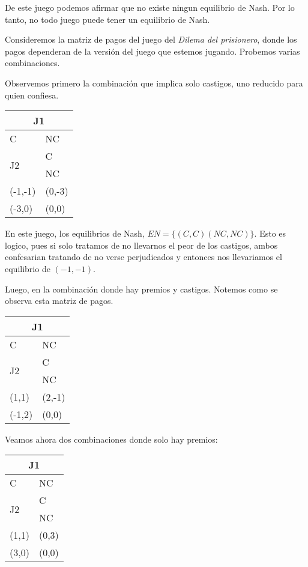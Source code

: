 \documentclass{homework}
\begin{document}
De este juego podemos afirmar que no existe ningun equilibrio de Nash. Por lo tanto, no todo juego puede tener un equilibrio de Nash.






Consideremos la matriz de pagos del juego del \textit{Dilema del prisionero}, donde los pagos dependeran de la versión del juego que estemos jugando. Probemos varias combinaciones. 

Observemos primero la combinación que implica solo castigos, uno reducido para quien confiesa.

\centering
\begin{tabular}{ll}
\hline
\multicolumn{2}{|c|}{J1} \\ \hline
C & NC \\ \hline
\hline
    \multirow{2}{}{J2}& C\\
    & NC\\ \hline

(-1,-1) & (0,-3) \\
(-3,0)  & (0,0) 
\end{tabular}

En este juego, los equilibrios de Nash, $EN = \{ (C,C) (NC, NC) \}$. Esto es logico, pues si solo tratamos de no llevarnos el peor de los castigos, ambos confesarian tratando de no verse perjudicados y entonces nos llevariamos el equilibrio de $(-1, -1)$. 

Luego, en la combinación donde hay premios y castigos. Notemos como se observa esta matriz de pagos.
\centering
\begin{tabular}{ll}
\hline
\multicolumn{2}{|c|}{J1} \\ \hline
C & NC \\ \hline
\hline
    \multirow{2}{|r|}{J2}& C\\
    & NC\\ \hline

(1,1) & (2,-1) \\
(-1,2)  & (0,0) 
\end{tabular}

Veamos ahora dos combinaciones donde solo hay premios:
\centering
\begin{tabular}{ll}

\hline
\multicolumn{2}{|c|}{J1} \\ \hline
C & NC \\ \hline
\hline
    \multirow{2}{|r|}{J2}& C\\
    & NC\\ \hline

(1,1) & (0,3) \\
(3,0)  & (0,0) 
\end{tabular}
\end{document}
